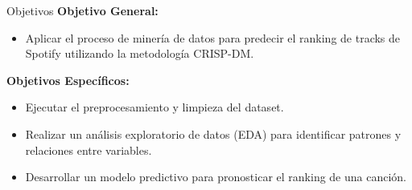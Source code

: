 \documentclass[10pt, xcolor=x11names,compress]{beamer}
\begin{document}
\begin{frame}{Objetivos}
    \textbf{Objetivo General:}
    \vspace{0.5em}
    \begin{itemize}
        \item Aplicar el proceso de minería de datos para predecir el ranking de tracks de Spotify utilizando la metodología CRISP-DM.
    \end{itemize}
    \vspace{1em}
    \textbf{Objetivos Específicos:}
    \vspace{0.5em}
    \begin{itemize}
        \item Ejecutar el preprocesamiento y limpieza del dataset.
        \item Realizar un análisis exploratorio de datos (EDA) para identificar patrones y relaciones entre variables.
        \item Desarrollar un modelo predictivo para pronosticar el ranking de una canción.
    \end{itemize}
\end{frame}
\end{document}
